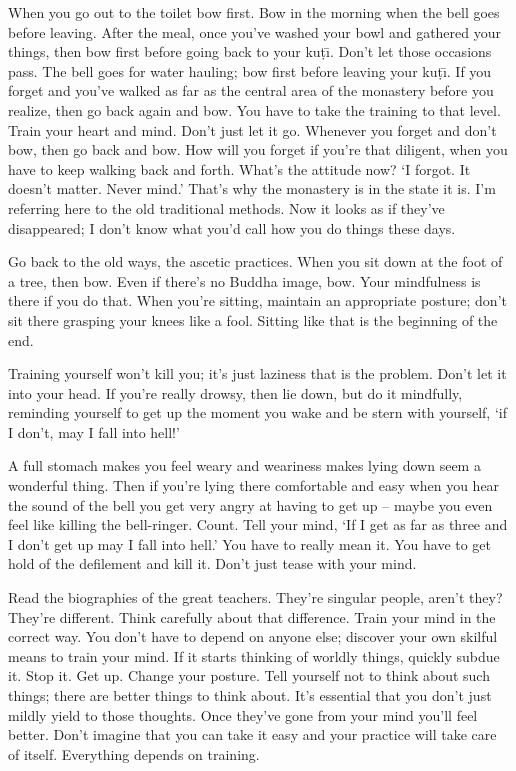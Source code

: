 When you go out to the toilet bow first. Bow in the morning when the bell goes before leaving. After the meal, once you've washed your bowl and gathered your things, then bow first before going back to your ku\d{t}\={\i}. Don't let those occasions pass. The bell goes for water hauling; bow first before leaving your ku\d{t}\={\i}. If you forget and you've walked as far as the central area of the monastery before you realize, then go back again and bow. You have to take the training to that level. Train your heart and mind. Don't just let it go. Whenever you forget and don't bow, then go back and bow. How will you forget if you're that diligent, when you have to keep walking back and forth. What's the attitude now? `I forgot. It doesn't matter. Never mind.' That's why the monastery is in the state it is. I'm referring here to the old traditional methods. Now it looks as if they've disappeared; I don't know what you'd call how you do things these days.

Go back to the old ways, the ascetic practices. When you sit down at the foot of a tree, then bow. Even if there's no Buddha image, bow. Your mindfulness is there if you do that. When you're sitting, maintain an appropriate posture; don't sit there grasping your knees like a fool. Sitting like that is the beginning of the end.

Training yourself won't kill you; it's just laziness that is the problem. Don't let it into your head. If you're really drowsy,  then lie down, but do it mindfully, reminding yourself to get up the moment you wake and be stern with yourself, `if I don't, may I fall into hell!'

A full stomach makes you feel weary and weariness makes lying down seem a wonderful thing. Then if you're lying there comfortable and easy when you hear the sound of the bell you get very angry at having to get up -- maybe you even feel like killing the bell-ringer. Count. Tell your mind, `If I get as far as three and I don't get up may I fall into hell.' You have to really mean it. You have to get hold of the defilement and kill it. Don't just tease with your mind.

Read the biographies of the great teachers. They're singular people, aren't they? They're different. Think carefully about that difference. Train your mind in the correct way. You don't have to depend on anyone else; discover your own skilful means to train your mind. If it starts thinking of worldly things, quickly subdue it. Stop it. Get up. Change your posture. Tell yourself not to think about such things; there are better things to think about. It's essential that you don't just mildly yield to those thoughts. Once they've gone from your mind you'll feel better. Don't imagine that you can take it easy and your practice will take care of itself. Everything depends on training.

